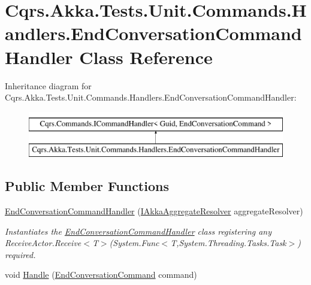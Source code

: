 \hypertarget{classCqrs_1_1Akka_1_1Tests_1_1Unit_1_1Commands_1_1Handlers_1_1EndConversationCommandHandler}{}\section{Cqrs.\+Akka.\+Tests.\+Unit.\+Commands.\+Handlers.\+End\+Conversation\+Command\+Handler Class Reference}
\label{classCqrs_1_1Akka_1_1Tests_1_1Unit_1_1Commands_1_1Handlers_1_1EndConversationCommandHandler}
Inheritance diagram for Cqrs.\+Akka.\+Tests.\+Unit.\+Commands.\+Handlers.\+End\+Conversation\+Command\+Handler\+:\begin{figure}[H]
\begin{center}
\leavevmode
\includegraphics[height=2.000000cm]{classCqrs_1_1Akka_1_1Tests_1_1Unit_1_1Commands_1_1Handlers_1_1EndConversationCommandHandler}
\end{center}
\end{figure}
\subsection*{Public Member Functions}
\begin{DoxyCompactItemize}
\item 
\hyperlink{classCqrs_1_1Akka_1_1Tests_1_1Unit_1_1Commands_1_1Handlers_1_1EndConversationCommandHandler_aaf3680b69f6cbad95722194c4c16cd1f_aaf3680b69f6cbad95722194c4c16cd1f}{End\+Conversation\+Command\+Handler} (\hyperlink{interfaceCqrs_1_1Akka_1_1Domain_1_1IAkkaAggregateResolver}{I\+Akka\+Aggregate\+Resolver} aggregate\+Resolver)
\begin{DoxyCompactList}\small\item\em Instantiates the \hyperlink{classCqrs_1_1Akka_1_1Tests_1_1Unit_1_1Commands_1_1Handlers_1_1EndConversationCommandHandler}{End\+Conversation\+Command\+Handler} class registering any Receive\+Actor.\+Receive$<$\+T$>$(\+System.\+Func$<$\+T,\+System.\+Threading.\+Tasks.\+Task$>$) required. \end{DoxyCompactList}\item 
void \hyperlink{classCqrs_1_1Akka_1_1Tests_1_1Unit_1_1Commands_1_1Handlers_1_1EndConversationCommandHandler_a45cc1e01d68fb5b241c9e46b333a149e_a45cc1e01d68fb5b241c9e46b333a149e}{Handle} (\hyperlink{classCqrs_1_1Akka_1_1Tests_1_1Unit_1_1Commands_1_1EndConversationCommand}{End\+Conversation\+Command} command)
\end{DoxyCompactItemize}
